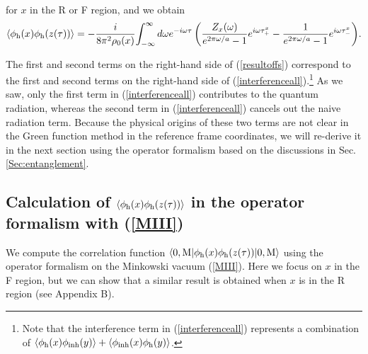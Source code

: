 \documentclass[aps,prd,preprintnumbers,nofootinbib,showpacs,11pt]{revtex4}%
\begin{document}
\begin{widetext}
\begin{eqnarray}
\end{eqnarray}
for $x$ in the R or F region, and we obtain \cite{IYZ,IYZ2013}
\begin{eqnarray}
\langle\phi_{\rm h}(x)\phi_{\rm h}(z(\tau))\rangle=
-{i\over 8\pi^2\rho_0(x)}
\displaystyle{
\int_{-\infty}^{\infty}d\omega e^{-i\omega\tau}
\left(
{Z_x(\omega)\over e^{2\pi\omega/a}-1}e^{i\omega\tau_+^x}
-{1\over e^{2\pi\omega/a}-1}e^{i\omega\tau_-^x}
\right)}.
\label{resultoffs}
\end{eqnarray}

The first and second terms on the right-hand side of (\ref{resultoffs})
correspond to the first and second terms on the right-hand side of 
(\ref{interferenceall}).\footnote{Note that the interference term in (\ref{interferenceall}) 
represents a combination of $\langle\phi_{\rm h}(x)\phi_{\rm inh}(y)\rangle
+\langle\phi_{\rm inh}(x)\phi_{\rm h}(y)\rangle$. }
As we saw, 
only the first term in (\ref{interferenceall}) contributes to 
the quantum radiation, whereas the second term in (\ref{interferenceall}) cancels out the naive radiation term. 
Because the physical origins of these two terms are not clear in the Green function 
method in the reference frame coordinates,
we will re-derive it in the next section 
using the operator formalism based on the discussions in Sec. \ref{Sec:entanglement}.


\subsection{Calculation of $\langle\phi_{\rm h}(x)\phi_{\rm h}(z(\tau))\rangle$ in the operator 
formalism with (\ref{MIII})
\label{Sec:interference-operator}
}
We compute the correlation function 
$\langle0,{\rm M}|\phi_{\rm h}(x) \phi_{\rm h}(z(\tau))|0,{\rm M}\rangle$  
using the operator formalism on the Minkowski vacuum (\ref{MIII}). 
Here we focus on $x$ in the F region, but 
we can show that a similar result is obtained when $x$ is in the R region (see Appendix B). 


\end{widetext}
\end{document}
